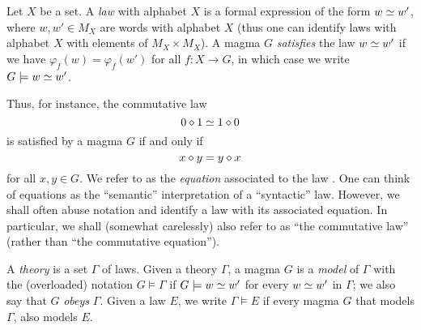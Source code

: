 \begin{definition}[Law]\label{law-def}
  \leanok
  Let $X$ be a set. A \emph{law} with alphabet $X$ is a formal expression of the form $w \simeq w'$,
  where $w, w' \in M_X$ are words with alphabet $X$ (thus one can identify laws with alphabet $X$
  with elements of $M_X \times M_X$).
  A magma $G$ \emph{satisfies} the law $w \simeq w'$ if
  we have $\varphi_f( w ) = \varphi_f ( w' )$ for all $f: X \to G$, in which case we write
  $G \models w \simeq w'$.
\end{definition}

Thus, for instance, the commutative law
\begin{equation}\label{comm-law}
  0 \diamond 1 \simeq 1 \diamond 0
\end{equation}
is satisfied by a magma $G$ if and only if
\begin{equation}\label{comm-law-2}
 x \diamond y = y \diamond x
\end{equation}
for all $x, y \in G$. We refer to  as the \emph{equation} associated to the law . One can think of equations as the ``semantic'' interpretation of a ``syntactic'' law. However, we shall often abuse notation and identify a law with its associated equation. In particular, we shall (somewhat carelessly) also refer to  as ``the commutative law'' (rather than ``the commutative equation'').

\begin{definition}[Models]\label{models-def}
  \leanok
  A \emph{theory} is a set $\Gamma$ of laws.
  Given a theory $\Gamma$, a magma $G$ is a \emph{model} of $\Gamma$ with the
  (overloaded) notation $G\models\Gamma$ if $G\models w\simeq w'$ for every $w\simeq w'$ in $\Gamma$; we also say that $G$ \emph{obeys} $\Gamma$.
  Given a law $E$, we write $\Gamma \models E$ if every magma $G$ that models $\Gamma$, also models $E$.
\end{definition}

